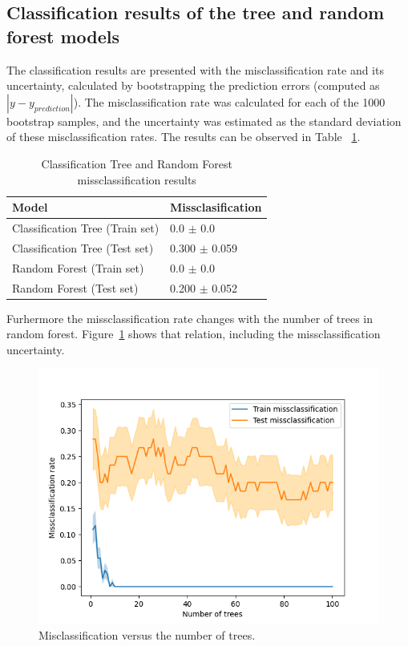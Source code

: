 \documentclass[9pt]{IEEEtran}
\begin{document}
\subsection{Classification results of the tree and random forest models} 
The classification results are presented with the misclassification rate and its uncertainty, 
calculated by bootstrapping the prediction errors (computed as $|y - y_{prediction}|$).
 The misclassification rate was calculated for each of the 1000 bootstrap samples, and the uncertainty
  was estimated as the standard deviation of these misclassification rates. 
 The results can be observed in Table ~\ref{tab:results}.  


 \begin{table}[h]
    \begin{tabular}{l|l}
    Model                           & Missclasification           \\
    \hline
    Classification Tree (Train set) & 0.0 $\pm$ 0.0                 \\
    Classification Tree (Test set)  & 0.300 $\pm$ 0.059  \\
    Random Forest (Train set)       & 0.0 $\pm$ 0.0                 \\
    Random Forest (Test set)        & 0.200 $\pm$ 0.052
    \end{tabular}
    \vspace{2px}
    \caption{Classification Tree and Random Forest missclassification results}
    \label{tab:results}
\end{table}

Furhermore the missclassification rate changes with the number of trees in random forest.
Figure~\ref{fig:missclass_num_trees} shows that relation, including the missclassification uncertainty. 

\begin{figure}[h]
    \centering
    \includegraphics[width=0.95\columnwidth]{figures/missclass_num_trees.png}
    \caption{Misclassification versus the number of trees.}
    \label{fig:missclass_num_trees}
\end{figure}
\end{document}
